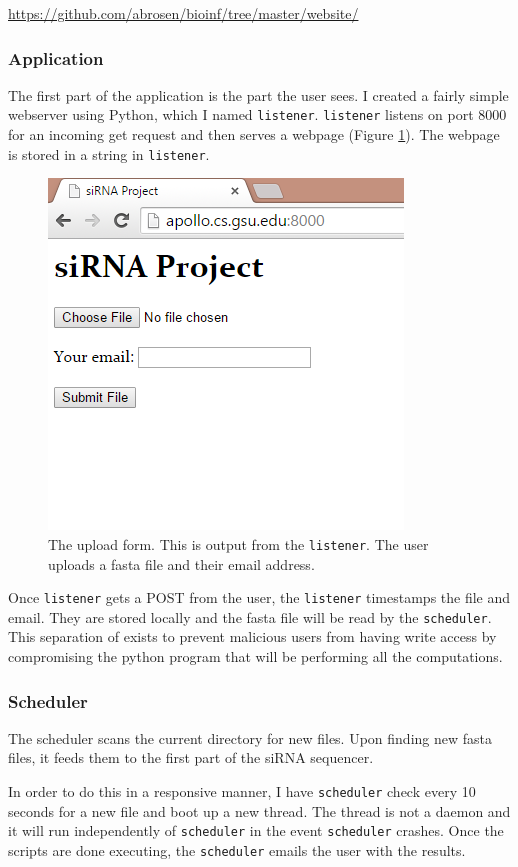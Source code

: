 \documentclass[10pt,letterpaper]{article}
\begin{document}
\url{https://github.com/abrosen/bioinf/tree/master/website/}

\subsubsection{Application}
The first part of the application is the part the user sees.
I created a fairly simple webserver using Python, which I named \texttt{listener}.
\texttt{listener} listens on port 8000 for an incoming get request and then serves a webpage (Figure \ref{fig:website}). 
The webpage is stored in a string in \texttt{listener}.

\begin{figure}
\centering
\includegraphics[width=0.5\linewidth]{website}
\caption{The upload form. This is output from the \texttt{listener}.  
	The user uploads a fasta file and their email address.}
\label{fig:website}
\end{figure}



Once \texttt{listener} gets a POST from the user, the \texttt{listener} timestamps the file  and email.
They are stored locally and the fasta file will be read by the \texttt{scheduler}.
This separation of exists to prevent malicious users from having write access by compromising the python program that will be performing all the computations.


\subsubsection{Scheduler}
The scheduler scans the current directory for new files.
Upon finding new fasta files, it feeds them to the first part of the siRNA sequencer.

In order to do this in a responsive manner, I have \texttt{scheduler} check every 10 seconds for a new file and boot up a new thread.
The thread is not a daemon and it will run independently of \texttt{scheduler} in the event \texttt{scheduler} crashes.
Once the scripts are done executing, the \texttt{scheduler} emails the user with the results.
\end{document}
